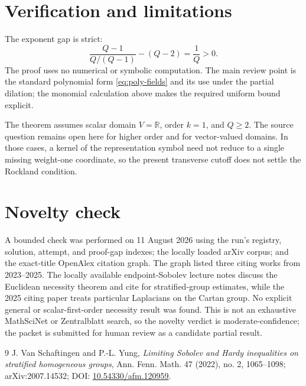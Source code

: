 \documentclass[11pt]{article}
\newcommand{\R}{\mathbb R}
\begin{document}
\section{Verification and limitations}

The exponent gap is strict:
\[
 \frac{Q-1}{Q/(Q-1)}-(Q-2)=\frac1Q>0.
\]
The proof uses no numerical or symbolic computation.  The main review point
is the standard polynomial form \eqref{eq:poly-fields} and its use under the
partial dilation; the monomial calculation above makes the required uniform
bound explicit.

The theorem assumes scalar domain $V=\R$, order $k=1$, and $Q\ge2$.  The
source question remains open here for higher order and for vector-valued
domains.  In those cases, a kernel of the representation symbol need not
reduce to a single missing weight-one coordinate, so the present transverse
cutoff does not settle the Rockland condition.

\section{Novelty check}

A bounded check was performed on 11 August 2026 using the run's registry,
solution, attempt, and proof-gap indexes; the locally loaded arXiv corpus; and
the exact-title OpenAlex citation graph.  The graph listed three citing works
from 2023--2025.  The locally available endpoint-Sobolev lecture notes discuss
the Euclidean necessity theorem and cite \cite{VSY} for stratified-group
estimates, while the 2025 citing paper treats particular Laplacians on the
Cartan group.  No explicit general or scalar-first-order necessity result was
found.  This is not an exhaustive MathSciNet or Zentralblatt search, so the
novelty verdict is moderate-confidence; the packet is submitted for human
review as a candidate partial result.

\begin{thebibliography}{9}
J. Van Schaftingen and P.-L. Yung,
\emph{Limiting Sobolev and Hardy inequalities on stratified homogeneous
groups}, Ann. Fenn. Math. 47 (2022), no. 2, 1065--1098;
arXiv:2007.14532; DOI: \href{https://doi.org/10.54330/afm.120959}{10.54330/afm.120959}.
\end{thebibliography}
\end{document}
